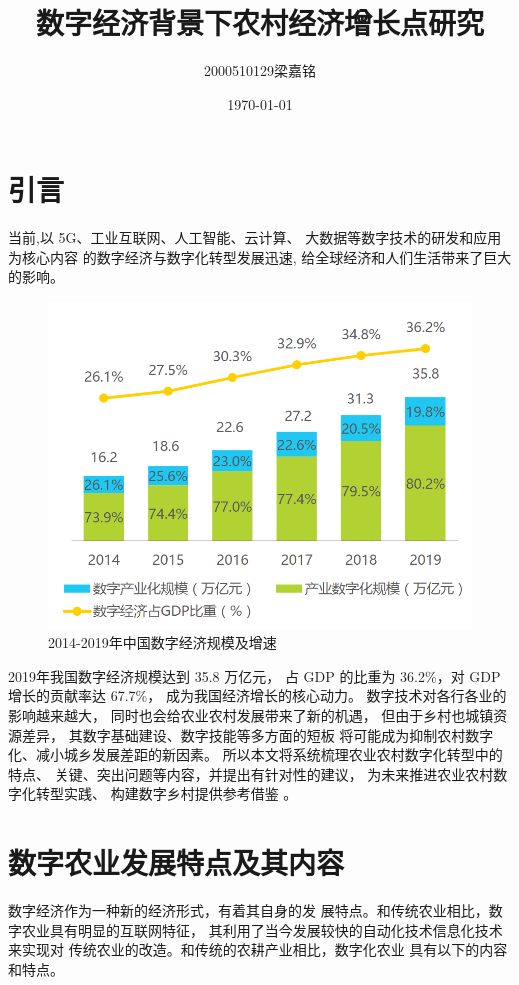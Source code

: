 \documentclass[a4paper]{article}
\title{\heiti\zihao{2} 数字经济背景下农村经济增长点研究}
\author{\songti 2000510129梁嘉铭}
\date{\today}
\begin{document}
\maketitle
\tableofcontents
\newpage

\section{引言}
当前,以 5G、工业互联网、人工智能、云计算、
大数据等数字技术的研发和应用为核心内容
的数字经济与数字化转型发展迅速,
给全球经济和人们生活带来了巨大的影响。\\
\begin{figure}[ht]
	\centering
	\includegraphics[scale=1]{digital.png}
	\caption{2014-2019年中国数字经济规模及增速}
\end{figure}
\par
2019年我国数字经济规模达到 35.8 万亿元，
占 GDP 的比重为 36.2\%，对 GDP 增长的贡献率达 67.7\%，
成为我国经济增长的核心动力。
数字技术对各行各业的影响越来越大，
同时也会给农业农村发展带来了新的机遇，
但由于乡村也城镇资源差异，
其数字基础建设、数字技能等多方面的短板
将可能成为抑制农村数字化、减小城乡发展差距的新因素。
所以本文将系统梳理农业农村数字化转型中的特点、
关键、突出问题等内容，并提出有针对性的建议，
为未来推进农业农村数字化转型实践、
构建数字乡村提供参考借鉴
\cite{sanren}。

\section{数字农业发展特点及其内容}
数字经济作为一种新的经济形式，有着其自身的发
展特点。和传统农业相比，数字农业具有明显的互联网特征，
其利用了当今发展较快的自动化技术信息化技术来实现对
传统农业的改造。和传统的农耕产业相比，数字化农业
具有以下的内容和特点。
\end{document}
